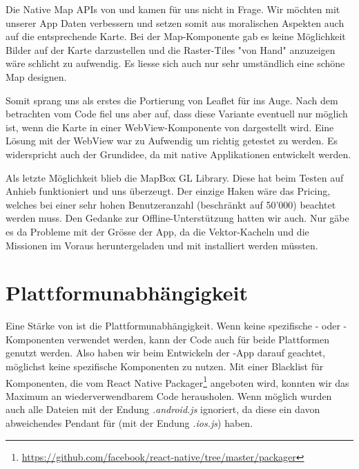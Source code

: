 Die Native Map APIs von  und  kamen für uns nicht in Frage.
Wir möchten mit unserer App  Daten verbessern und setzen somit aus moralischen Aspekten auch auf die entsprechende Karte.
Bei der  Map-Komponente gab es keine Möglichkeit Bilder auf der Karte darzustellen und die Raster-Tiles "von Hand" anzuzeigen wäre schlicht zu aufwendig. 
Es liesse sich auch nur sehr umständlich eine schöne Map designen.

Somit sprang uns als erstes die Portierung von Leaflet für  ins Auge. 
Nach dem betrachten vom Code fiel uns aber auf, dass diese Variante eventuell nur möglich ist, wenn die Karte in einer WebView-Komponente von  dargestellt wird.
Eine Lösung mit der WebView war zu Aufwendig um richtig getestet zu werden. 
Es widerspricht auch der Grundidee, da mit  native Applikationen entwickelt werden.

Als letzte Möglichkeit blieb die MapBox GL Library.
Diese hat beim Testen auf Anhieb funktioniert und uns überzeugt.
Der einzige Haken wäre das Pricing, welches bei einer sehr hohen Benutzeranzahl (beschränkt auf 50'000) beachtet werden muss.
Den Gedanke zur Offline-Unterstützung hatten wir auch.
Nur gäbe es da Probleme mit der Grösse der App, da die Vektor-Kacheln und die Missionen im Voraus heruntergeladen und mit installiert werden müssten.

\section{Plattformunabhängigkeit}
Eine Stärke von  ist die Plattformunabhängigkeit. 
Wenn keine spezifische - oder -Komponenten verwendet werden, kann der Code auch für beide Plattformen genutzt werden.
Also haben wir beim Entwickeln der -App darauf geachtet, möglichst keine spezifische Komponenten zu nutzen. 
Mit einer Blacklist für Komponenten, die vom React Native Packager\footnote{\url{https://github.com/facebook/react-native/tree/master/packager}} angeboten wird, konnten wir das Maximum an wiederverwendbarem Code herausholen. 
Wenn möglich wurden auch alle Dateien mit der Endung \textit{.android.js} ignoriert, da diese ein davon abweichendes Pendant für  (mit der Endung \textit{.ios.js}) haben.